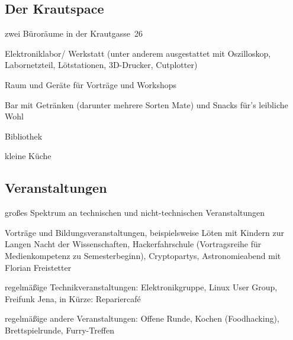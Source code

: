 \documentclass[a4paper,12pt,twoside]{scrartcl}
\begin{document}
\subsection*{Der Krautspace}
\begin{compactitem}
\item zwei Büroräume in der Krautgasse~26
\item Elektroniklabor/ Werkstatt (unter anderem ausgestattet mit Oszilloskop, 
  Labornetzteil, Lötstationen, 3D-Drucker, Cutplotter)
\item Raum und Geräte für Vorträge und Workshops
\item Bar mit Getränken (darunter mehrere Sorten Mate) und Snacks für's 
  leibliche Wohl
\item Bibliothek
\item kleine Küche
\end{compactitem}

\subsection*{Veranstaltungen}
\begin{compactitem}
\item großes Spektrum an technischen und nicht-technischen Veranstaltungen
\item Vorträge und Bildungsveranstaltungen, beispielsweise Löten mit Kindern 
  zur Langen Nacht der Wissenschaften, Hackerfahrschule (Vortragsreihe für 
  Medienkompetenz zu Semesterbeginn), Cryptopartys, Astronomieabend mit 
  Florian Freistetter
\item regelmäßige Technikveranstaltungen: Elektronikgruppe, Linux User Group, 
  Freifunk Jena, in Kürze: Repariercafé
\item regelmäßige andere Veranstaltungen: Offene Runde, Kochen (Foodhacking), 
  Brettspielrunde, Furry-Treffen
\end{compactitem}
\end{document}
